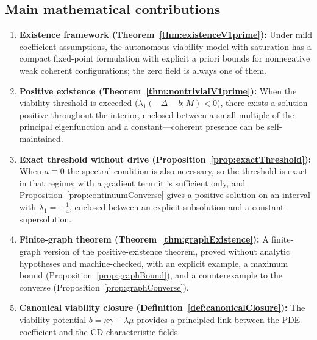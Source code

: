 \documentclass[11pt]{article}
\theoremstyle{plain}
\theoremstyle{definition}
\theoremstyle{remark}
\begin{document}
\subsection*{Main mathematical contributions}
\begin{enumerate}[label=(\roman*)]
\item \textbf{Existence framework (Theorem~\ref{thm:existenceV1prime}):} Under mild coefficient assumptions, the autonomous viability model with saturation has a compact fixed-point formulation with explicit a priori bounds for nonnegative weak coherent configurations; the zero field is always one of them.
\item \textbf{Positive existence (Theorem~\ref{thm:nontrivialV1prime}):} When the viability threshold is exceeded (\(\lambda_1(-\Delta - b; M) < 0\)), there exists a solution positive throughout the interior, enclosed between a small multiple of the principal eigenfunction and a constant---coherent presence can be self-maintained.
\item \textbf{Exact threshold without drive (Proposition~\ref{prop:exactThreshold}):} When \(a\equiv 0\) the spectral condition is also necessary, so the threshold is exact in that regime; with a gradient term it is sufficient only, and Proposition~\ref{prop:continuumConverse} gives a positive solution on an interval with \(\lambda_1=+\tfrac14\), enclosed between an explicit subsolution and a constant supersolution.
\item \textbf{Finite-graph theorem (Theorem~\ref{thm:graphExistence}):} A finite-graph version of the positive-existence theorem, proved without analytic hypotheses and machine-checked, with an explicit example, a maximum bound (Proposition~\ref{prop:graphBound}), and a counterexample to the converse (Proposition~\ref{prop:graphConverse}).
\item \textbf{Canonical viability closure (Definition~\ref{def:canonicalClosure}):} The viability potential \(b = \kappa\gamma - \lambda\mu\) provides a principled link between the PDE coefficient and the CD characteristic fields.
\end{enumerate}
\end{document}

